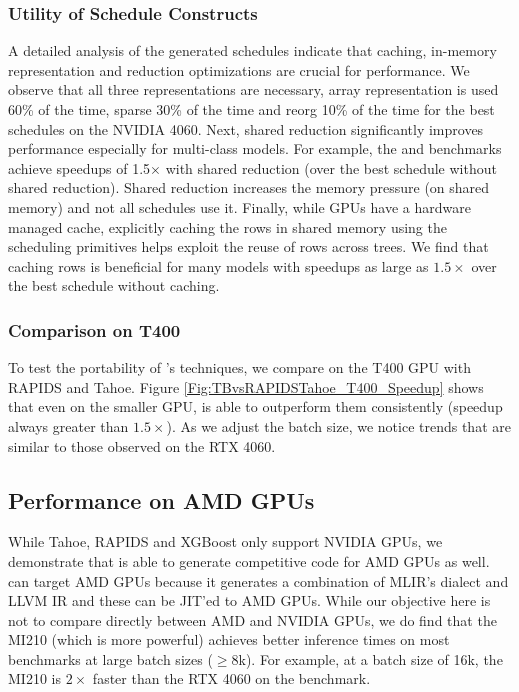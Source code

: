 \subsubsection*{Utility of Schedule Constructs}
A detailed analysis of the generated schedules indicate that caching, in-memory representation 
and reduction optimizations are crucial for performance. We observe that all three representations 
are necessary, array representation is used 60\% of the time, sparse 30\% of the time and reorg 
10\% of the time for the best schedules on the NVIDIA 4060.  
Next, shared reduction significantly improves performance especially for multi-class models. For example, 
the  and  benchmarks achieve speedups of 1.5$\times$ with shared reduction (over the best schedule without shared reduction). 
Shared reduction increases the memory pressure (on shared memory) and not all schedules use it.
Finally, while GPUs have a hardware managed cache, explicitly caching the rows in shared memory using the scheduling primitives 
helps exploit the reuse of rows across trees. We find that caching rows is beneficial for many models
with speedups as large as $1.5\times$ over the best schedule without caching.

\subsubsection*{Comparison on T400}
To test the portability of \Treebeard{}'s techniques, we compare \Treebeard{} on the T400 GPU with RAPIDS and Tahoe. 
Figure \ref{Fig:TBvsRAPIDSTahoe_T400_Speedup} shows 
that even on the smaller GPU, \Treebeard{} is able to outperform them consistently (speedup always greater than $1.5\times$). 
As we adjust the batch size, we notice trends that are similar to those observed on the RTX 4060.

\subsection{Performance on AMD GPUs}
While Tahoe, RAPIDS and XGBoost only support NVIDIA GPUs, we demonstrate that \Treebeard{} 
is able to generate competitive code for AMD GPUs as well. \Treebeard{} can target AMD GPUs 
because it generates a combination of MLIR's  dialect and LLVM IR 
and these can be JIT'ed to AMD GPUs. While our objective here is not to compare directly 
between AMD and NVIDIA GPUs, we do find that the MI210 (which is more powerful) achieves better inference times 
on most benchmarks at large batch sizes ($\geq8$k). For example, at a batch size of 16k,
the MI210 is $2\times$ faster than the RTX 4060 on the  benchmark. 

